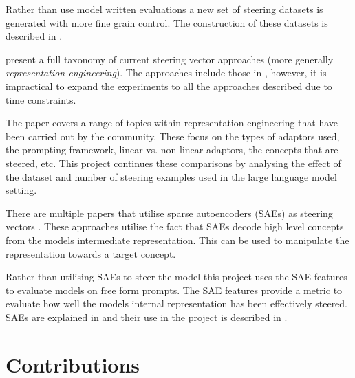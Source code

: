 Rather than use model written evaluations \citep{mwe} a new set of steering datasets is generated with more fine grain control.
The construction of these datasets is described in .

present a full taxonomy of current steering vector approaches (more generally \emph{representation engineering}).
The approaches include those in \citet{steering-clear}, however, it is impractical to expand the experiments to all the approaches described due to time constraints.

The paper covers a range of topics within representation engineering that have been carried out by the community.
These focus on the types of adaptors used, the prompting framework, linear vs. non-linear adaptors, the concepts that are steered, etc.
This project continues these comparisons by analysing the effect of the dataset and number of steering examples used in the large language model setting.

There are multiple papers that utilise sparse autoencoders (SAEs) as steering vectors \citep{sae-improved, sae-steering, icl-sae}.
These approaches utilise the fact that SAEs decode high level concepts from the models intermediate representation.
This can be used to manipulate the representation towards a target concept.

Rather than utilising SAEs to steer the model this project uses the SAE features to evaluate models on free form prompts.
The SAE features provide a metric to evaluate how well the models internal representation has been effectively steered.
SAEs are explained in  and their use in the project is described in .

\section{Contributions}
\label{sec:contributions}
